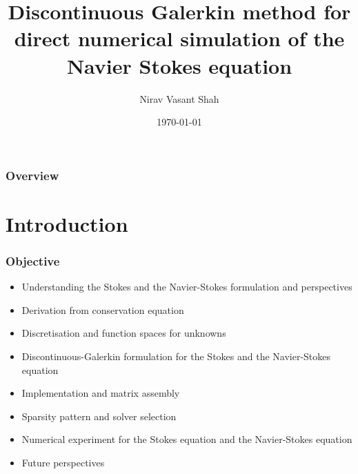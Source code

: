 \documentclass{beamer}
\title[DG for Navier Stokes]{Discontinuous Galerkin method for direct numerical simulation of the Navier Stokes equation} %
\author{Nirav Vasant Shah} %
\institute[Universit\"at Stuttgart] %
{
Universit\"at Stuttgart \\ %
\medskip
\textit{niravshah.svnit@gmail.com} %
}
\date{\today} %
\begin{document}
\begin{frame}
\titlepage %
\end{frame}

\begin{frame}
\frametitle{Overview} %
\tableofcontents %
\end{frame}


\section{Introduction} %
\begin{frame}
\frametitle{Objective}
\begin{itemize}

\item Understanding the Stokes and the Navier-Stokes formulation and perspectives
\item Derivation from conservation equation
\item Discretisation and function spaces for unknowns
\item Discontinuous-Galerkin formulation for the Stokes and the Navier-Stokes equation
\item Implementation and matrix assembly
\item Sparsity pattern and solver selection
\item Numerical experiment for the Stokes equation and the Navier-Stokes equation
\item Future perspectives

\end{itemize}


\end{frame}
\end{document}
